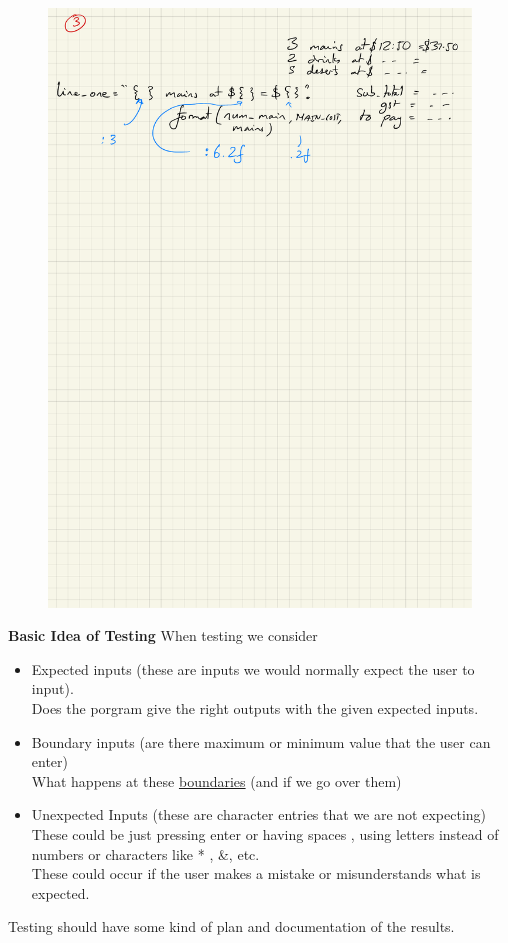 \documentclass[a4paper,12pt]{article}
\begin{document}
\begin{figure} [!h]
	\centering
	\includegraphics[width=12cm]{iterative_processes/simple_planning_2.pdf}
\end{figure}
\textbf{Basic Idea of Testing}
When testing we consider
\begin{itemize}
	\item Expected inputs (these are inputs we would normally expect the user to input).\\
	Does the porgram give the right outputs with the given expected inputs.
	\item Boundary inputs (are there maximum or minimum value that the user can enter)\\
	What happens at these \underline{boundaries} (and if we go over them)
	\item Unexpected Inputs  (these are character entries that we are not expecting)\\
	These could be just pressing enter or having spaces , using letters instead of numbers or characters like * , \&, etc.\\
	These could occur if the user makes a mistake or misunderstands what is expected.
\end{itemize}
Testing should have some kind of plan and documentation of the results.\\
\end{document}
